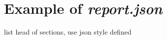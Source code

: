 \chapter{Example of \emph{report.json}} \label{app:report_example}

list head of sections, use json style defined